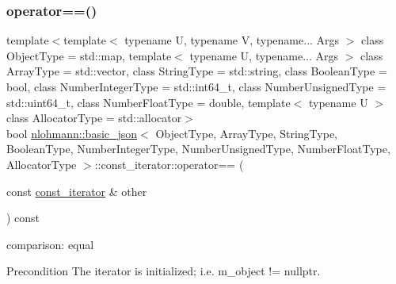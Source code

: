 \subsubsection{\texorpdfstring{operator==()}{operator==()}}
{\footnotesize\ttfamily template$<$template$<$ typename U, typename V, typename... Args $>$ class Object\+Type = std\+::map, template$<$ typename U, typename... Args $>$ class Array\+Type = std\+::vector, class String\+Type  = std\+::string, class Boolean\+Type  = bool, class Number\+Integer\+Type  = std\+::int64\+\_\+t, class Number\+Unsigned\+Type  = std\+::uint64\+\_\+t, class Number\+Float\+Type  = double, template$<$ typename U $>$ class Allocator\+Type = std\+::allocator$>$ \\
bool \hyperlink{classnlohmann_1_1basic__json}{nlohmann\+::basic\+\_\+json}$<$ Object\+Type, Array\+Type, String\+Type, Boolean\+Type, Number\+Integer\+Type, Number\+Unsigned\+Type, Number\+Float\+Type, Allocator\+Type $>$\+::const\+\_\+iterator\+::operator== (\begin{DoxyParamCaption}\item[{const \hyperlink{classnlohmann_1_1basic__json_1_1const__iterator}{const\+\_\+iterator} \&}]{other }\end{DoxyParamCaption}) const\hspace{0.3cm}{\ttfamily [inline]}}



comparison\+: equal 

\begin{DoxyPrecond}{Precondition}
The iterator is initialized; i.\+e. {\ttfamily m\+\_\+object != nullptr}. 
\end{DoxyPrecond}
\mbox{\label{classnlohmann_1_1basic__json_1_1const__iterator_a3a7ed729e72bc7c1d0b75ed8cc2bd830}} 

